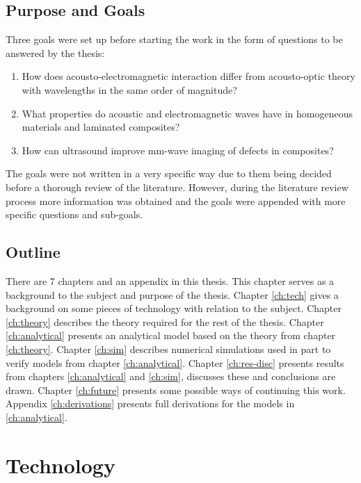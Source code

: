 \documentclass[11pt,twoside]{eitExjobb}
\begin{document}
	\section{Purpose and Goals}
	Three goals were set up before starting the work in the form of questions to be answered by the thesis:
	\begin{enumerate}
		\item How does acousto-electromagnetic interaction differ from acousto-optic theory with wavelengths in the same order of magnitude?
		\item What properties do acoustic and electromagnetic waves have in homogeneous materials and laminated composites?
		\item How can ultrasound improve mm-wave imaging of defects in composites?
	\end{enumerate}
	The goals were not written in a very specific way due to them being decided before a thorough review of the literature. However, during the literature review process more information was obtained and the goals were appended with more specific questions and sub-goals.
	
	\section{Outline}
	There are 7 chapters and an appendix in this thesis. This chapter serves as a background to the subject and purpose of the thesis. Chapter \ref{ch:tech} gives a background on some pieces of technology with relation to the subject. Chapter \ref{ch:theory} describes the theory required for the rest of the thesis. Chapter \ref{ch:analytical} presents an analytical model based on the theory from chapter \ref{ch:theory}. Chapter \ref{ch:sim} describes numerical simulations used in part to verify models from chapter \ref{ch:analytical}. Chapter \ref{ch:res-disc} presents results from chapters \ref{ch:analytical} and \ref{ch:sim}, discusses these and conclusions are drawn. Chapter \ref{ch:future} presents some possible ways of continuing this work. Appendix \ref{ch:derivations} presents full derivations for the models in \ref{ch:analytical}.
	
	\chapter{Technology \label{ch:tech}}
	
\end{document}
